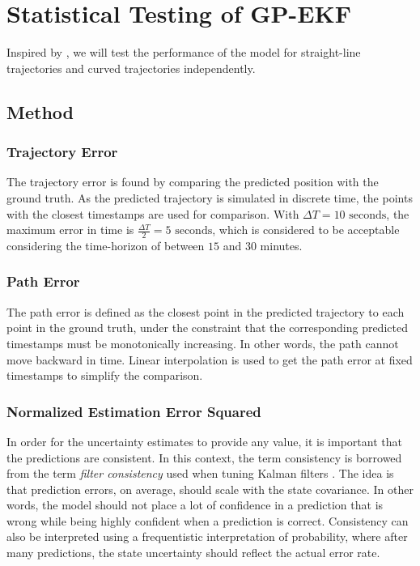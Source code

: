 \chapter{Statistical Testing of GP-EKF}\label{chap:stat_testing}
Inspired by \cite{hexeberg}, we will test the performance of the model for straight-line trajectories and curved trajectories independently.

\section{Method}
\subsection{Trajectory Error}
The trajectory error is found by comparing the predicted position with the ground truth. As the predicted trajectory is simulated in discrete time, the points with the closest timestamps are used for comparison. With $\Delta T = 10\text{ seconds}$, the maximum error in time is $\frac{\Delta T}{2} = 5 \text{ seconds}$, which is considered to be acceptable considering the time-horizon of between $15$ and $30$ minutes. 
\subsection{Path Error}
The path error is defined as the closest point in the predicted trajectory to each point in the ground truth, under the constraint that the corresponding predicted timestamps must be monotonically increasing. In other words, the path cannot move backward in time. Linear interpolation is used to get the path error at fixed timestamps to simplify the comparison. 

\subsection{Normalized Estimation Error Squared}
In order for the uncertainty estimates to provide any value, it is important that the predictions are consistent. In this context, the term consistency is borrowed from the term \textit{filter consistency} used when tuning Kalman filters \cite{sensorfusjon}. The idea is that prediction errors, on average, should scale with the state covariance. In other words, the model should not place a lot of confidence in a prediction that is wrong while being highly confident when a prediction is correct. Consistency can also be interpreted using a frequentistic interpretation of probability, where after many predictions, the state uncertainty should reflect the actual error rate. 

